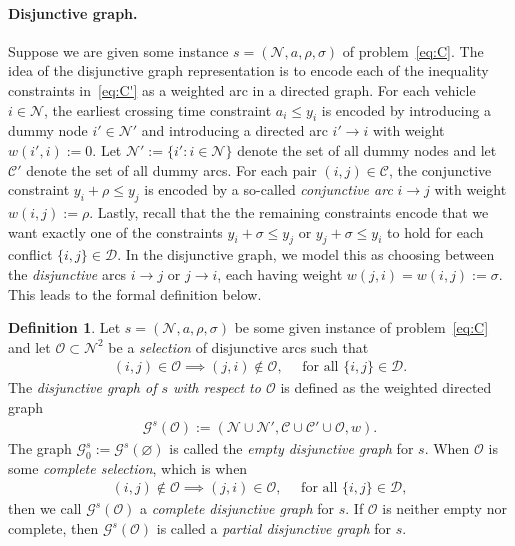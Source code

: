 \documentclass[a4paper]{report}
\theoremstyle{definition}
\newtheorem{define}{Definition}[chapter]
\theoremstyle{plain}
\begin{document}
\paragraph{Disjunctive graph.}

Suppose we are given some instance $s = (\mathcal{N}, a, \rho, \sigma)$ of
problem~\eqref{eq:C}.
%
The idea of the disjunctive graph representation is to encode each of the
inequality constraints in~\eqref{eq:C'} as a weighted arc in a directed graph.
%
For each vehicle $i \in \mathcal{N}$, the earliest crossing time constraint
  $a_i \leq y_i$
is encoded by introducing a dummy node $i' \in \mathcal{N}'$ and introducing a
directed arc $i' \rightarrow i$ with weight $w(i', i) := 0$.
%
Let $\mathcal{N}' := \{ i' : i \in \mathcal{N}\}$ denote the set of all dummy
nodes and let $\mathcal{C}'$ denote the set of all dummy arcs.
%
For each pair $(i,j) \in \mathcal{C}$, the conjunctive constraint
  $y_i + \rho \leq y_j$
is encoded by a so-called \emph{conjunctive arc} $i \rightarrow j$ with weight
$w(i,j) := \rho$.
%
Lastly, recall that the the remaining constraints encode that we want exactly
one of the constraints $y_i + \sigma \leq y_j$ or $y_j + \sigma \leq y_i$ to
hold for each conflict $\{i,j\} \in \mathcal{D}$.
%
In the disjunctive graph, we model this as choosing between the
\emph{disjunctive} arcs $i \rightarrow j$ or $j \rightarrow i$, each having
weight $w(j,i) = w(i,j) := \sigma$.
%
This leads to the formal definition below.

\begin{define}
  Let $s=(\mathcal{N}, a, \rho, \sigma)$ be some given instance of
  problem~\eqref{eq:C} and let $\mathcal{O} \subset \mathcal{N}^2$ be a
  \emph{selection} of disjunctive arcs such that
  \begin{align}\tag{dg.1}
    (i,j) \in \mathcal{O} \implies (j, i) \notin \mathcal{O} , \quad \text{ for all } \{i,j\} \in \mathcal{D} .
  \end{align}
  The \emph{disjunctive graph of $s$ with respect to $\mathcal{O}$} is defined
  as the weighted directed graph
  \begin{align}\tag{dg.2}
    \mathcal{G}^s(\mathcal{O}) := (\mathcal{N} \cup \mathcal{N}', \mathcal{C} \cup \mathcal{C}' \cup \mathcal{O}, w) .
  \end{align}
  The graph $\mathcal{G}_0^s := \mathcal{G}^s(\varnothing)$ is called the
  \emph{empty disjunctive graph} for $s$.
  When $\mathcal{O}$ is some \emph{complete selection}, which is when
  \begin{align}\tag{dg.3}
    (i,j) \notin \mathcal{O} \implies (j, i) \in \mathcal{O},  \quad \text{ for all } \{i,j\} \in \mathcal{D} ,
  \end{align}
  then we call $\mathcal{G}^s(\mathcal{O})$ a \emph{complete disjunctive graph}
  for $s$.
  If $\mathcal{O}$ is neither empty nor complete, then
  $\mathcal{G}^s(\mathcal{O})$ is called a \emph{partial disjunctive graph} for
  $s$.
\end{define}
\end{document}
